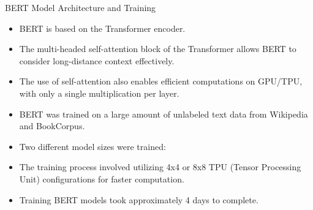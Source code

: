 \documentclass[handout]{beamer}
\begin{document}
\begin{frame}{BERT Model Architecture and Training}
\begin{scriptsize}
\begin{itemize}
\item BERT is based on the Transformer encoder.
\item The multi-headed self-attention block of the Transformer  allows BERT to consider long-distance context effectively.
\item The use of self-attention also enables efficient computations on GPU/TPU, with only a single multiplication per layer.
\item BERT was trained on a large amount of unlabeled text data from Wikipedia and BookCorpus.
\item Two different model sizes were trained:
\item The training process involved utilizing 4x4 or 8x8 TPU (Tensor Processing Unit) configurations for faster computation.
\item Training BERT models took approximately 4 days to complete.
\end{itemize}
\end{scriptsize}
\end{frame}
\end{document}
